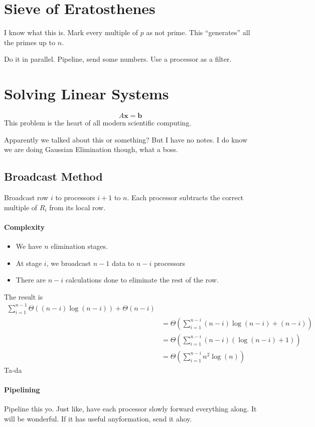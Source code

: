 \documentclass[12pt]{article}
\numberwithin{equation}{section}
\newcommand{\vect}[1] {\mathbf{#1}} %
\theoremstyle{theorem}
\theoremstyle{definition}
\theoremstyle{remark}
\begin{document}
\date{April 28, 2015}
\section{Sieve of Eratosthenes}
I know what this is.  Mark every multiple of $p$ as not prime.  This ``generates'' all the primes up to $n$. 

Do it in parallel.  Pipeline, send some numbers. Use a processor as a filter.

\section{Solving Linear Systems}
\begin{equation}
A\vect{x} = \vect{b}
\end{equation}
This problem is the heart of all modern scientific computing. 

Apparently we talked about this or something?  But I have no notes.  I do know we are doing Gaussian Elimination though, what a boss. 

\subsection{Broadcast Method}
Broadcast row $i$ to processors $i + 1$ to $n$.  Each processor subtracts the correct multiple of $R_i$ from its local row.  
\paragraph{Complexity} 
\begin{itemize}
\item We have $n$ elimination stages.  \\
\item At stage $i$, we broadcast $n - 1$ data to $n - i$ processors
\item There are $n - i$ calculations done to eliminate the rest of the row.
\end{itemize}
The result is 
\begin{align}
\sum_{i=1}^{n-1} \Theta((n - i)\log(n - i)) + \Theta(n - i) \\
	&= \Theta(\sum_{i=1}^{n-i} (n-i)\log(n-i) + (n-i)) \\
	&= \Theta(\sum_{i=1}^{n-i} (n - i)(\log(n - i) + 1)) \\
	&= \Theta(\sum_{i=1}^{n-i} n^2\log(n))
\end{align}
Ta-da

\paragraph{Pipelining}
Pipeline this yo.  Just like, have each processor slowly forward everything along.  It will be wonderful.  If it has useful anyformation, send it ahoy. 
\end{document}
